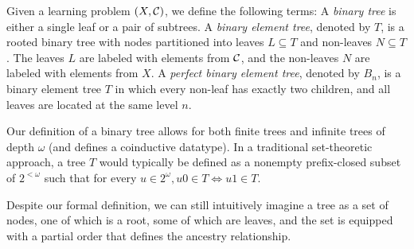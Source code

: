 \begin{definition}
\label{def:tree}
\begin{outline}
\0 Given a learning problem $(X,\mathcal{C})$, we define the following terms:
    \1 A \emph{binary tree} is either a single leaf or a pair of subtrees.
    \1 A \emph{binary element tree}, denoted by $T$, is a rooted binary tree with nodes partitioned into leaves $L \subseteq T$ and non-leaves $N \subseteq T$. The leaves $L$ are labeled with elements from $\mathcal{C}$, and the non-leaves $N$ are labeled with elements from $X$.
    \1 A \emph{perfect binary element tree}, denoted by $B_n$, is a binary element tree $T$ in which every non-leaf has exactly two children, and all leaves are located at the same level $n$.
\end{outline}
\end{definition}

Our definition of a binary tree allows for both finite trees and infinite trees of depth $\omega$ (and defines a coinductive datatype). In a traditional set-theoretic approach, a tree $T$ would typically be defined as a nonempty prefix-closed subset of $2^{<\omega}$ such that for every $u\in 2^{\omega}, u0 \in T\iff u1\in T$. 

Despite our formal definition, we can still intuitively imagine a tree as a set of nodes, one of which is a root, some of which are leaves, and the set is equipped with a partial order that defines the ancestry relationship. 
        

